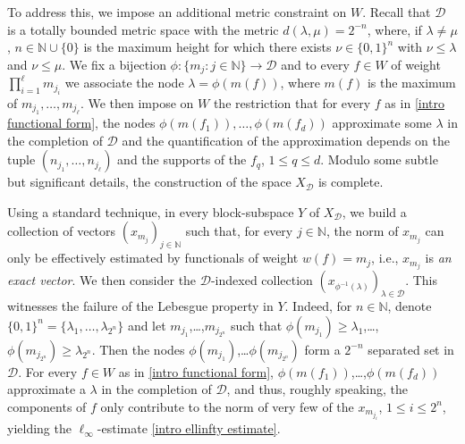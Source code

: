 \documentclass[12pt,a4paper]{amsart}
\newcommand{\N}{\mathbb{N}}
\theoremstyle{definition}
\theoremstyle{plain}
\begin{document}
To address this, we impose an additional metric constraint on $W$. Recall that $\mathcal{D}$ is a totally bounded metric space with the metric $d(\lambda,\mu) = 2^{-n}$, where, if $\lambda\neq\mu$, $n\in\N\cup\{0\}$ is the maximum height for which there exists $\nu\in\{0,1\}^n$ with $\nu\leq \lambda$ and $\nu\leq \mu$. We fix a bijection $\phi:\{m_j:j\in\N\}\to \mathcal{D}$ and to every $f\in W$ of weight $\prod_{i=1}^\ell m_{j_i}$ we associate the node $\lambda = \phi(m(f))$, where $m(f)$ is the maximum of $m_{j_1},\ldots,m_{j_\ell}$. We then impose on $W$ the restriction that for every $f$ as in \eqref{intro functional form}, the nodes $\phi(m(f_1)),\ldots,\phi(m(f_d))$ approximate some $\lambda$ in the completion of $\mathcal{D}$ and the quantification of the approximation depends on the tuple $(n_{j_1},\ldots, n_{j_\ell})$ and the supports of the $f_q$, $1\leq q\leq d$. Modulo some subtle but significant details, the construction of the space $X_\mathcal{D}$ is complete.

Using a standard technique, in every block-subspace $Y$ of $X_\mathcal{D}$, we build a collection of vectors $(x_{m_j})_{j\in\mathbb{N}}$ such that, for every $j\in\mathbb{N}$, the norm of $x_{m_j}$ can only be effectively estimated by functionals of weight $w(f) = m_j$, i.e., $x_{m_j}$ is {\em an exact vector}. We then consider the $\mathcal{D}$-indexed collection $(x_{\phi^{-1}(\lambda)})_{\lambda\in\mathcal{D}}$. This witnesses the failure of the Lebesgue property in $Y$. Indeed, for $n\in\N$, denote $\{0,1\}^n = \{\lambda_1,\ldots,\lambda_{2^n}\}$ and let $m_{j_1}$,\ldots,$m_{j_{2^n}}$ such that $\phi(m_{j_1}) \geq \lambda_1$,\ldots,$\phi(m_{j_{2^n}})\geq \lambda_{2^n}$. Then the nodes $\phi(m_{j_1})$,\ldots$\phi(m_{j_{2^n}})$ form a $2^{-n}$ separated set in $\mathcal{D}$. For every $f\in W$ as in \eqref{intro functional form}, $\phi(m(f_1))$,\ldots,$\phi(m(f_d))$ approximate a $\lambda$ in the completion of $\mathcal{D}$, and thus, roughly speaking, the components of $f$ only contribute to the norm of very few of the $x_{m_{j_i}}$, $1\leq i\leq 2^n$, yielding the $\ell_\infty$-estimate \eqref{intro ellinfty estimate}.
\end{document}
